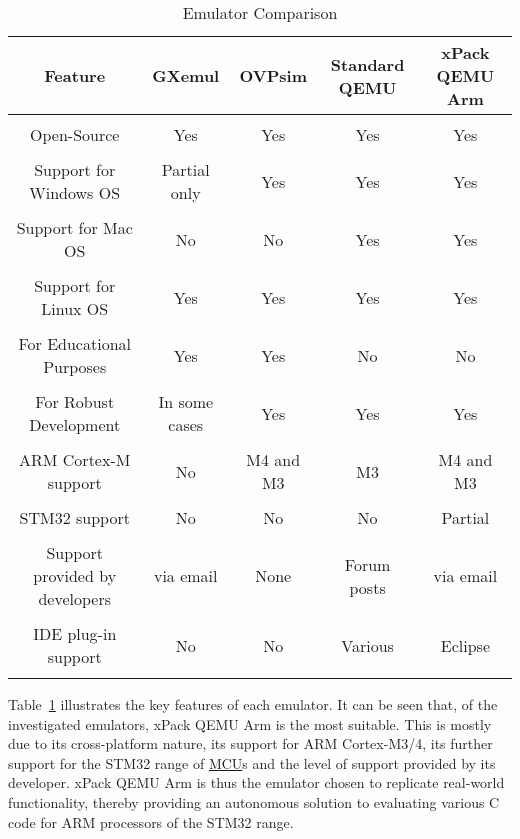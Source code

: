 \begin{center}
	\begin{table}[H]
	\centering
	\begin{adjustbox}{angle = 270}
    	\begin{tabular}{|c|c|c|c|c|}
   		\hline
   		Feature & GXemul & OVPsim & Standard QEMU & xPack QEMU Arm\\
    	\hline
    	&  &  &  & \\
    	Open-Source & Yes & Yes & Yes & Yes\\
    	&  &  &  & \\
    	Support for Windows OS & Partial only & Yes & Yes & Yes\\
    	&  &  &  & \\
    	Support for Mac OS & No & No & Yes & Yes\\ 
    	&  &  &  & \\
    	Support for Linux OS & Yes & Yes & Yes & Yes\\
    	&  &  &  & \\ 
    	For Educational Purposes & Yes & Yes & No & No\\ 
    	&  &  &  & \\
    	For Robust Development & In some cases & Yes & Yes & Yes\\
    	&  &  &  & \\
    	ARM Cortex-M support & No & M4 and M3 & M3 & M4 and M3\\
    	&  &  &  & \\ 
   		STM32 support & No & No & No & Partial\\
   		&  &  &  & \\
   		Support provided by developers & via email & None & 			Forum posts & via email\\
   		&  &  &  & \\
   		IDE plug-in support & No & No & Various & Eclipse\\
   		&  &  &  & \\
   		\hline
    	\end{tabular}
    	\end{adjustbox}
    	\caption{Emulator Comparison}
		\label{emComp}
	\end{table}
\end{center}

Table~\ref{emComp} illustrates the key features of each emulator. It can be seen  that, of the investigated emulators, xPack QEMU Arm is the most suitable. This is mostly due to its cross-platform nature, its support for ARM Cortex-M3/4, its further support for the STM32 range of \hyperref[listAbr]{MCU}s and the level of support provided by its developer. xPack QEMU Arm is thus the emulator chosen to replicate real-world functionality, thereby providing an autonomous solution to evaluating various C code for ARM processors of the STM32 range.

